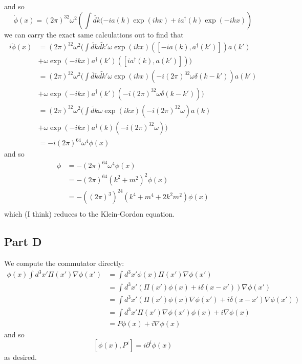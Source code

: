 \documentclass[fontsize=11pt]{scrartcl} %
\numberwithin{equation}{section} %
\numberwithin{figure}{section} %
\numberwithin{table}{section} %
\newcommand{\ad}{a^{\dagger}}
\begin{document}
and so
\[
    \dot{\phi}(x) = (2\pi)^32\omega^2\left( \int \tilde{dk}(-ia(k)\exp(ikx) +
        i\ad(k)\exp(-ikx) \right)
\]
we can carry the exact same calculations out to find that
\[
    \begin{aligned}
        i\ddot{\phi}(x) &= (2\pi)^32\omega^2(
            \int\tilde{dk}\tilde{dk'}\omega\exp(ikx)([-ia(k),\ad(k')])a(k')\\
        &+\omega\exp(-ikx)\ad(k')([i\ad(k),a(k')]))\\
        &=
        (2\pi)^32\omega^2(
            \int\tilde{dk}\tilde{dk'}\omega\exp(ikx)(-i(2\pi)^32\omega\delta(k-k'))a(k')\\
        &+\omega\exp(-ikx)\ad(k')(-i(2\pi)^32\omega\delta(k-k')))\\
        &=
        (2\pi)^32\omega^2(
            \int\tilde{dk}\omega\exp(ikx)(-i(2\pi)^32\omega)a(k)\\
        &+\omega\exp(-ikx)\ad(k)(-i(2\pi)^32\omega))\\
        &=-i(2\pi)^64\omega^4\phi(x)
    \end{aligned}
\]
and so
\[
    \begin{aligned}
        \ddot{\phi} &= -(2\pi)^64\omega^4\phi(x)\\
        &= -(2\pi)^64(k^2 + m^2)^2\phi(x)\\
        &= -((2\pi)^3)^24(k^4 + m^4 + 2k^2m^2)\phi(x)\\
    \end{aligned}
\]
which (I think) reduces to the Klein-Gordon equation.


\subsection*{Part D}
We compute the commutator directly:
\[
    \begin{aligned}
        \phi(x)\int d^3x' \Pi(x')\nabla\phi(x')
        &= \int d^3x' \phi(x)\Pi(x')\nabla\phi(x')\\
        &= \int d^3x' (\Pi(x')\phi(x) + i\delta(x-x'))\nabla\phi(x')\\
        &= \int d^3x' (\Pi(x')\phi(x)\nabla\phi(x') +
            i\delta(x-x')\nabla\phi(x'))\\
            &= \int d^3x'\Pi(x')\nabla\phi(x')\phi(x) + i\nabla\phi(x)\\
            &=P\phi(x) + i\nabla\phi(x)
    \end{aligned}
\]
and so
\[
    [\phi(x),P^i] = i\partial^i\phi(x)
\]
as desired.
\end{document}
